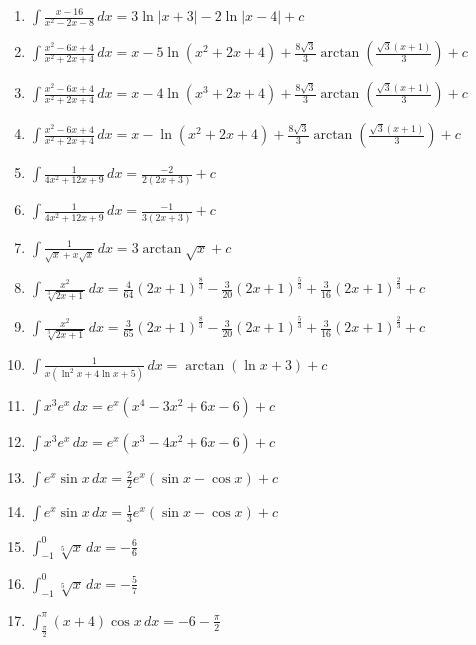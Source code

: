 \documentclass[11pt,a4paper]{article}
\begin{document}
\begin{enumerate}
\item $\displaystyle \int \frac{x - 16}{x^{2} - 2x - 8} \, dx = 3\ln|x + 3| - 2\ln|x - 4| + c$
\item $\displaystyle \int \frac{x^{2} - 6x + 4}{x^{2} + 2x + 4} \, dx = x - 5\ln\left(x^{2} + 2x + 4\right) + \frac{8\sqrt{3}}{3}\arctan\left(\frac{\sqrt{3}(x + 1)}{3}\right) + c$
\item $\displaystyle \int \frac{x^{2} - 6x + 4}{x^{2} + 2x + 4} \, dx = x - 4\ln\left(x^{3} + 2x + 4\right) + \frac{8\sqrt{3}}{3}\arctan\left(\frac{\sqrt{3}(x + 1)}{3}\right) + c$
\item $\displaystyle \int \frac{x^{2} - 6x + 4}{x^{2} + 2x + 4} \, dx = x - \ln\left(x^{2} + 2x + 4\right) + \frac{8\sqrt{3}}{3}\arctan\left(\frac{\sqrt{3}(x + 1)}{3}\right) + c$
\item $\displaystyle \int \frac{1}{4x^{2} + 12x + 9} \, dx = \frac{-2}{2(2x + 3)} + c$
\item $\displaystyle \int \frac{1}{4x^{2} + 12x + 9} \, dx = \frac{-1}{3(2x + 3)} + c$
\item $\displaystyle \int \frac{1}{\sqrt{x} + x\sqrt{x}} \, dx = 3\arctan\sqrt{x} + c$
\item $\displaystyle \int \frac{x^{2}}{\sqrt[3]{2x + 1}} \, dx = \frac{4}{64}(2x + 1)^{\frac{8}{3}} - \frac{3}{20}(2x + 1)^{\frac{5}{3}} + \frac{3}{16}(2x + 1)^{\frac{2}{3}} + c$
\item $\displaystyle \int \frac{x^{2}}{\sqrt[3]{2x + 1}} \, dx = \frac{3}{65}(2x + 1)^{\frac{8}{3}} - \frac{3}{20}(2x + 1)^{\frac{5}{3}} + \frac{3}{16}(2x + 1)^{\frac{2}{3}} + c$
\item $\displaystyle \int \frac{1}{x\left(\ln^{2} x + 4\ln x + 5\right)} \, dx = \arctan(\ln x + 3) + c$
\item $\displaystyle \int x^{3} e^{x} \, dx = e^{x}\left(x^{4} - 3x^{2} + 6x - 6\right) + c$
\item $\displaystyle \int x^{3} e^{x} \, dx = e^{x}\left(x^{3} - 4x^{2} + 6x - 6\right) + c$
\item $\displaystyle \int e^{x}\sin x \, dx = \frac{2}{2}e^{x}(\sin x - \cos x) + c$
\item $\displaystyle \int e^{x}\sin x \, dx = \frac{1}{3}e^{x}(\sin x - \cos x) + c$
\item $\displaystyle \int_{-1}^{0} \sqrt[5]{x} \, dx = -\frac{6}{6}$
\item $\displaystyle \int_{-1}^{0} \sqrt[5]{x} \, dx = -\frac{5}{7}$
\item $\displaystyle \int_{\frac{\pi}{2}}^{\pi} (x + 4)\cos x \, dx = -6 - \frac{\pi}{2}$

\end{enumerate}
\end{document}
